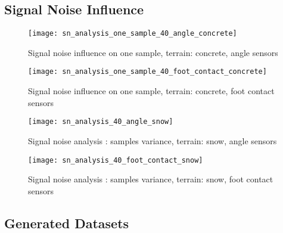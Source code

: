 \subsection{Signal Noise Influence} \label{ssec:signal_noise_influence}

\begin{figure}[H]
  \centering
  \texttt{[image: sn\_analysis\_one\_sample\_40\_angle\_concrete]}
  \caption{Signal noise influence on one sample, terrain: concrete, angle sensors}
  \label{fig:sn_analysis_one_sample_angle_concrete}
\end{figure}

\begin{figure}[H]
  \centering
  \texttt{[image: sn\_analysis\_one\_sample\_40\_foot\_contact\_concrete]}
  \caption{Signal noise influence on one sample, terrain: concrete, foot contact sensors}
  \label{fig:sn_analysis_one_sample_foot_contact_concrete}
\end{figure}

\begin{figure}[H]
  \centering
  \texttt{[image: sn\_analysis\_40\_angle\_snow]}
  \caption{Signal noise analysis : samples variance, terrain: snow, angle sensors}
  \label{fig:sn_analysis_angle_snow}
\end{figure}

\begin{figure}[H]
  \centering
  \texttt{[image: sn\_analysis\_40\_foot\_contact\_snow]}
  \caption{Signal noise analysis : samples variance, terrain: snow, foot contact sensors}
  \label{fig:sn_analysis_foot_contact_snow}
\end{figure}

\subsection{Generated Datasets} \label{ssec:generated_datasets}

